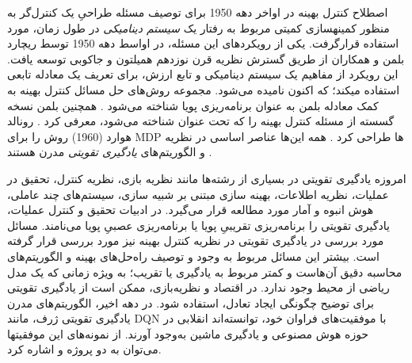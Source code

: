 اصطلاح کنترل بهینه
در اواخر دهه 1950
برای توصیف مسئله طراحیِ یک کنترل‌گر به منظور کمینه\nf سازی کمیتی مربوط به رفتار یک \textit{سیستم دینامیکی} در طول زمان، مورد استفاده قرارگرفت. یکی از رویکردهای این مسئله، در اواسط دهه 1950 توسط ریچارد بلمن و همکاران از طریق گسترش نظریه قرن نوزدهم همیلتون و جاکوبی
 توسعه یافت. این رویکرد از مفاهیم 
\textit{}
 یک سیستم دینامیکی و تابع ارزش، برای تعریف یک معادله تابعی استفاده می\nf کند؛ که اکنون 
 \textit{
 }
  نامیده می‌شود. مجموعه روش‌های حل مسائل کنترل بهینه به کمک معادله بلمن به عنوان برنامه‌ریزی پویا شناخته می‌شود
  \cite{bellman1957dynamic}.
   همچنین بلمن نسخه گسسته از مسئله کنترل بهینه را که تحت عنوان 
  \textit{
  } 
شناخته می‌شود، معرفی کرد
\cite{bellman1957markovian}.
 رونالد هوارد (1960) روش 
\textit{
}
را برای MDP‌‌ ها طراحی کرد
\cite{howard1960dynamic}. 
همه این‌ها عناصر اساسی در نظریه و الگوریتم‌های \textit{یادگیری تقویتی} مدرن هستند
\cite{suttonbook}.


امروزه یادگیری تقویتی
در بسیاری از رشته‌ها مانند نظریه بازی، نظریه کنترل، تحقیق در عملیات، نظریه اطلاعات، بهینه سازی مبتنی بر شبیه سازی، سیستم‌های چند عاملی، هوش انبوه و آمار مورد مطالعه قرار می‌گیرد. در ادبیات تحقیق و کنترل عملیات، یادگیری تقویتی را برنامه‌ریزی تقریبیِ پویا   یا برنامه‌ریزی عصبیِ پویا   می‌نامند. مسائل مورد بررسی در یادگیری تقویتی در نظریه کنترل بهینه  نیز مورد بررسی قرار گرفته است. بیشتر این مسائل مربوط به وجود و توصیف راه‌حل‌های بهینه و الگوریتم‌های محاسبه دقیق آن‌هاست و کمتر مربوط به یادگیری یا تقریب؛ به ویژه زمانی که یک مدل ریاضی از محیط وجود ندارد. در اقتصاد و نظریه‌بازی، ممکن است از یادگیری تقویتی برای توضیح چگونگی ایجاد تعادل، استفاده شود. در دهه اخیر، الگوریتم‌های مدرن یادگیری تقویتی ژرف، مانند DQN با موفقیت‌های فراوان خود، توانسته‌اند انقلابی در حوزه هوش مصنوعی و یادگیری ماشین به‌وجود آورند. از نمونه‌های این موفقیت\nf ها می‌توان به دو پروژه
 و
   اشاره کرد.
  
  \paragraph{}
    
